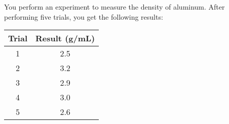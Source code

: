 \documentclass[11pt]{exam}
\begin{document}
\begin{questions}






  \question
    You perform an experiment to measure the density of
    aluminum.  After performing five trials, you get the
    following results:
    \begin{center}
      \begin{tabular}{cc}
        \hline
        \bf Trial & {\bf Result} (g/mL) \\
        \hline
          1       &   2.5               \\
          2       &   3.2               \\
          3       &   2.9               \\
          4       &   3.0               \\
          5       &   2.6               \\
        \hline \hline
      \end{tabular}

\end{center}
\end{questions}
\end{document}
